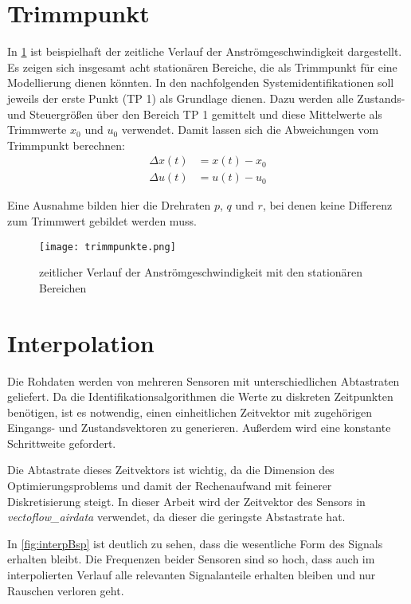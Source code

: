 \section{Trimmpunkt} %
In \cref{fig:trimmpunkte} ist beispielhaft der zeitliche Verlauf der Anströmgeschwindigkeit dargestellt. Es zeigen sich 
insgesamt acht stationären Bereiche, die als Trimmpunkt für eine Modellierung dienen könnten. In den nachfolgenden 
Systemidentifikationen soll jeweils der erste Punkt (TP 1) als Grundlage dienen. Dazu werden alle Zustands- und Steuergrößen 
über den Bereich TP 1 gemittelt und diese Mittelwerte als Trimmwerte $ x_0 $ und $ u_0 $ verwendet. Damit lassen sich die 
Abweichungen vom Trimmpunkt berechnen:
\begin{equation}
	\begin{split}
		\Delta x(t) &= x(t)-x_0\\
		\Delta u(t) &= u(t)-u_0
	\end{split}
\end{equation}

Eine Ausnahme bilden hier die Drehraten $ p $, $ q $ und $ r $, bei denen keine Differenz zum Trimmwert gebildet werden muss.


\begin{figure}[h!]
	\centering
	\texttt{[image: trimmpunkte.png]}
	\caption{zeitlicher Verlauf der Anströmgeschwindigkeit mit den stationären Bereichen}
	\label{fig:trimmpunkte}
\end{figure}




\section{Interpolation} \label{sec:interp} %

Die Rohdaten werden von mehreren Sensoren mit unterschiedlichen Abtastraten 
geliefert. Da die Identifikationsalgorithmen die Werte zu diskreten Zeitpunkten 
benötigen, ist es notwendig, einen einheitlichen Zeitvektor mit zugehörigen 
Eingangs- und Zustandsvektoren zu generieren. Außerdem wird eine konstante 
Schrittweite gefordert.

Die Abtastrate dieses Zeitvektors ist wichtig, da die Dimension des 
Optimierungsproblems und damit der Rechenaufwand mit feinerer Diskretisierung 
steigt. In dieser Arbeit wird der Zeitvektor des Sensors in 
\textit{vectoflow\_airdata} verwendet, da dieser die geringste Abstastrate hat.

In \cref{fig:interpBsp} ist deutlich zu sehen, dass die wesentliche Form des 
Signals erhalten bleibt. Die Frequenzen beider Sensoren sind so hoch, dass auch 
im interpolierten Verlauf alle relevanten Signalanteile erhalten bleiben und 
nur Rauschen verloren geht.


